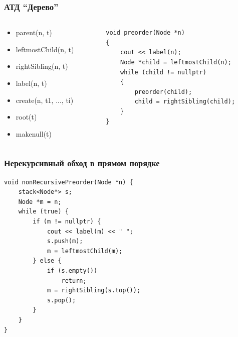 \documentclass[xetex,mathserif,serif]{beamer}
\begin{document}
	\begin{frame}[fragile]
		\frametitle{АТД ``Дерево''}
		\begin{columns}
			\begin{column}{0.6\textwidth}
				\begin{itemize}
					\item parent(n, t)
					\item leftmostChild(n, t)
					\item rightSibling(n, t)
					\item label(n, t)
					\item create(n, t1, ..., ti)
					\item root(t)
					\item makenull(t)
				\end{itemize}
			\end{column}
			\begin{column}{0.4\textwidth}
				\begin{footnotesize}
					\begin{verbatim}
void preorder(Node *n)
{
    cout << label(n);
    Node *child = leftmostChild(n);
    while (child != nullptr)
    {
        preorder(child);
        child = rightSibling(child);
    }
}
					\end{verbatim}
				\end{footnotesize}
			\end{column}
		\end{columns}
	\end{frame}

	\begin{frame}[fragile]
		\frametitle{Нерекурсивный обход в прямом порядке}
		\begin{footnotesize}
			\begin{verbatim}
void nonRecursivePreorder(Node *n) {
    stack<Node*> s;
    Node *m = n;
    while (true) {
        if (m != nullptr) {
            cout << label(m) << " ";
            s.push(m);
            m = leftmostChild(m);
        } else {
            if (s.empty())
                return;
            m = rightSibling(s.top());
            s.pop();
        }
    }
}
			\end{verbatim}
		\end{footnotesize}
	\end{frame}
\end{document}
